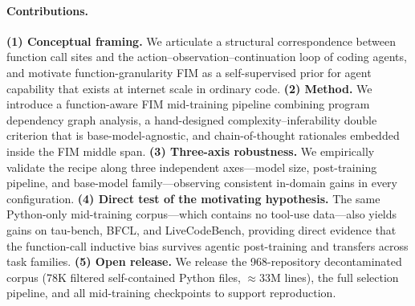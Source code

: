 \paragraph{Contributions.}
\textbf{(1) Conceptual framing.} We articulate a structural correspondence
between function call sites and the action--observation--continuation loop
of coding agents, and motivate function-granularity FIM as a
self-supervised prior for agent capability that exists at internet scale
in ordinary code.
\textbf{(2) Method.} We introduce a function-aware FIM mid-training
pipeline combining program dependency graph analysis, a hand-designed
complexity--inferability double criterion that is base-model-agnostic, and
chain-of-thought rationales embedded inside the FIM middle span.
\textbf{(3) Three-axis robustness.} We empirically validate the recipe
along three independent axes---model size, post-training pipeline, and
base-model family---observing consistent in-domain gains in every
configuration.
\textbf{(4) Direct test of the motivating hypothesis.} The same Python-only
mid-training corpus---which contains no tool-use data---also yields gains
on tau-bench, BFCL, and LiveCodeBench, providing direct evidence that the
function-call inductive bias survives agentic post-training and transfers
across task families.
\textbf{(5) Open release.} We release the 968-repository decontaminated
corpus (78K filtered self-contained Python files, $\approx 33\mathrm{M}$
lines), the full selection pipeline, and all mid-training checkpoints to
support reproduction.